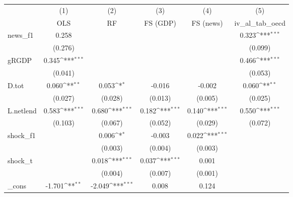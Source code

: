 {
\def\sym#1{\ifmmode^{#1}\else\(^{#1}\)\fi}
\begin{tabular}{l*{5}{c}}
\toprule
            &\multicolumn{1}{c}{(1)}&\multicolumn{1}{c}{(2)}&\multicolumn{1}{c}{(3)}&\multicolumn{1}{c}{(4)}&\multicolumn{1}{c}{(5)}\\
            &\multicolumn{1}{c}{OLS}&\multicolumn{1}{c}{RF}&\multicolumn{1}{c}{FS (GDP)}&\multicolumn{1}{c}{FS (news)}&\multicolumn{1}{c}{iv\_al\_tab\_oecd}\\
\midrule
news\_f1     &       0.258         &                     &                     &                     &       0.323\sym{***}\\
            &     (0.276)         &                     &                     &                     &     (0.099)         \\
\addlinespace
gRGDP       &       0.345\sym{***}&                     &                     &                     &       0.466\sym{***}\\
            &     (0.041)         &                     &                     &                     &     (0.053)         \\
\addlinespace
D.tot       &       0.060\sym{**} &       0.053\sym{*}  &      -0.016         &      -0.002         &       0.060\sym{**} \\
            &     (0.027)         &     (0.028)         &     (0.013)         &     (0.005)         &     (0.025)         \\
\addlinespace
L.netlend   &       0.583\sym{***}&       0.680\sym{***}&       0.182\sym{***}&       0.140\sym{***}&       0.550\sym{***}\\
            &     (0.103)         &     (0.067)         &     (0.052)         &     (0.029)         &     (0.072)         \\
\addlinespace
shock\_f1    &                     &       0.006\sym{*}  &      -0.003         &       0.022\sym{***}&                     \\
            &                     &     (0.003)         &     (0.004)         &     (0.003)         &                     \\
\addlinespace
shock\_t     &                     &       0.018\sym{***}&       0.037\sym{***}&       0.001         &                     \\
            &                     &     (0.004)         &     (0.007)         &     (0.001)         &                     \\
\addlinespace
\_cons      &      -1.701\sym{**} &      -2.049\sym{***}&       0.008         &       0.124         &                     \\

\end{tabular}}
